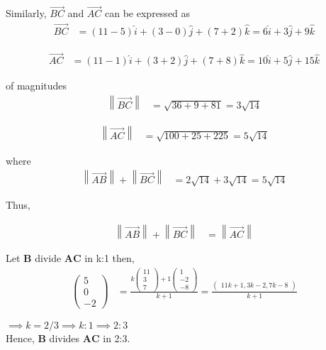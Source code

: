 \documentclass[12pt]{article}
\providecommand{\norm}[1]{\left\lVert#1\right\rVert}
\newcommand{\myvec}[1]{\ensuremath{\begin{pmatrix}#1\end{pmatrix}}}
\let\vec\mathbf
\begin{document}
\begin{enumerate}
		Similarly, $\overrightarrow{BC}$ and $\overrightarrow{AC}$ can be expressed as\\

		\begin{align}
			\overrightarrow{BC} &=
			(11-5)\hat{i}+(3-0)\hat{j}+(7+2)\hat{k} =
		6\hat{i}+3\hat{j}+9\hat{k}
		\end{align}

		\begin{align}
			\overrightarrow{AC} &=
			(11-1)\hat{i}+(3+2)\hat{j}+(7+8)\hat{k} =
		10\hat{i}+5\hat{j}+15\hat{k}
		\end{align}
		
		of magnitudes\\
		
		\begin{align} 
		\norm{\overrightarrow{BC}} &=
			\sqrt{36+9+81} =
		3\sqrt{14}
		\end{align}


		\begin{align} 
		\norm{\overrightarrow{AC}} &=
			\sqrt{100+25+225} =
		5\sqrt{14}
		\end{align}
		
		where\\

		\begin{align}
			\norm{\overrightarrow{AB}}+\norm{\overrightarrow{BC}} &= 
			2\sqrt{14}+3\sqrt{14} = 5\sqrt{14}
		\end{align}

		Thus,

		\begin{align}
			\norm{\overrightarrow{AB}}+\norm{\overrightarrow{BC}} &= 
			\norm{\overrightarrow{AC}}
		\end{align}

		Let $\vec{B}$ divide $\vec{AC}$ in k:1 then,\\
		
		\begin{align}
			\myvec{5\\0\\-2} &=
			\frac{k\myvec{11\\3\\7}+1\myvec{1\\-2\\-8}}{k+1} =
			\frac{\myvec{11k+1,3k-2,7k-8}}{k+1}
		\end{align}
		
		$\implies k=2/3 \implies k:1 \implies 2:3$ \\
		
		Hence, $\vec{B}$ divides $\vec{AC}$ in 2:3.


\end{enumerate}
\end{document}
